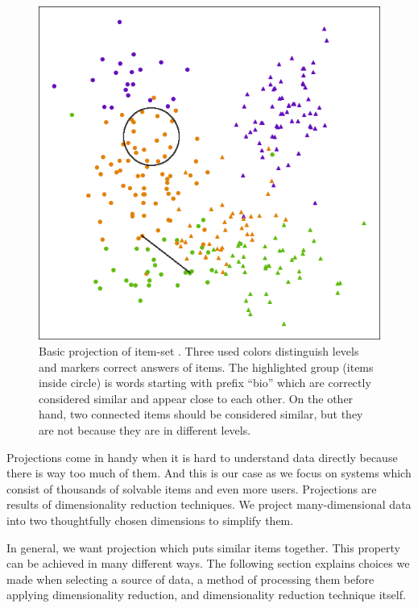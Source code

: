 \documentclass[
  digital, %
  table,   %
  nolof,     %
  nolot,     %
  nocover,
  color,
  final, %
]{fithesis3}
\begin{document}
\begin{figure}
    \includegraphics[width=\textwidth]{img/common_projection}
  \caption{Basic projection of item-set \cviceniB{}. Three used colors distinguish levels and markers correct answers of items. The highlighted group (items inside circle) is words starting with prefix ``bio'' which are correctly considered similar and appear close to each other. On the other hand, two connected items should be considered similar, but they are not because they are in different levels.}
  \label{fig:common_projection}
\end{figure}


Projections come in handy when it is hard to understand data directly because there is way too much of them. And this is our case as we focus on systems which consist of thousands of solvable items and even more users. Projections are results of dimensionality reduction techniques. We project many-dimensional data into two thoughtfully chosen dimensions to simplify them.


In general, we want projection which puts similar items together. This property can be achieved in many different ways. The following section explains choices we made when selecting a source of data, a method of processing them before applying dimensionality reduction, and dimensionality reduction technique itself.
\end{document}
